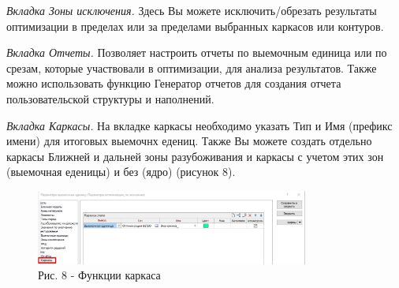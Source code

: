 \begin{multicols}{2}
\emph{Вкладка Зоны исключения.} Здесь Вы можете исключить/обрезать
результаты оптимизации в пределах или за пределами выбранных каркасов
или контуров.

\emph{Вкладка Отчеты.} Позволяет настроить отчеты по выемочным единица
или по срезам, которые участвовали в оптимизации, для анализа
результатов. Также можно использовать функцию Генератор отчетов для
создания отчета пользовательской структуры и наполнений.

\emph{Вкладка Каркасы.} На вкладке каркасы необходимо указать Тип и Имя
(префикс имени) для итоговых выемочнх едениц. Также Вы можете создать
отдельно каркасы Ближней и дальней зоны разубоживания и каркасы с учетом
этих зон (выемочная еденицы) и без (ядро) (рисунок 8).
\end{multicols}

\begin{figure}[H]
	\centering
	\includegraphics[width=0.8\textwidth]{assets/1257}
	\caption*{Рис. 8 - Функции каркаса}
\end{figure}

